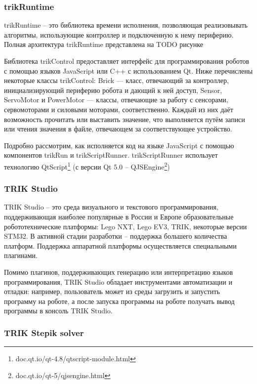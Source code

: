 \documentclass[14pt]{matmex-diploma-custom}
\begin{document}
\subsubsection{trikRuntime}
trikRuntime -- это библиотека времени исполнения, позволяющая реализовывать алгоритмы, использующие контроллер и подключенную к нему периферию. Полная архитектура trikRuntime представлена на TODO рисунке

Библиотека trikControl предоставляет интерфейс для программирования роботов с помощью языков JavaScript или C++ с использованием Qt. Ниже перечислены некоторые классы trikControl: Brick — класс, отвечающий за контроллер, инициализирующий периферию робота и дающий к ней доступ, Sensor, ServoMotor и PowerMotor — классы, отвечающие за работу с сенсорами, сервомоторами и силовыми моторами, соответственно. Каждый из них даёт возможность прочитать или выставить значение, что выполняется путём записи или чтения значения в файле, отвечающем за соответствующее устройство.


Подробно рассмотрим, как исполняется код на языке JavaScript с помощью компонентов trikRun и trikScriptRunner. trikScriptRunner использует технологию QtScript\footnote{doc.qt.io/qt-4.8/qtscript-module.html} (с версии Qt 5.0 -- QJSEngine\footnote{doc.qt.io/qt-5/qjsengine.html})

\subsubsection{TRIK Studio}
TRIK Studio -- это среда визуального и текстового программирования, поддерживающая наиболее популярные в России и Европе образовательные робототехнические платформы: Lego NXT, Lego EV3, TRIK, некоторые версии STM32. В активной стадии разработки -- поддержка большего количества платформ. Поддержка аппаратной платформы осуществляется специальными плагинами.

Помимо плагинов, поддерживающих генерацию или интерпретацию языков программирования, TRIK Studio обладает инструментами автоматизации и отладки: например, пользователь может из среды загрузить и запустить программу на роботе, а после запуска программы на роботе получать вывод программы в консоль TRIK Studio.

\subsubsection{TRIK Stepik solver}
\end{document}
